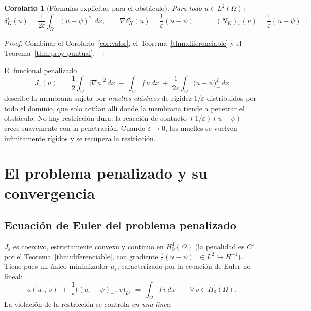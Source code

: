 \documentclass[11pt,a4paper]{article}
\newtheorem{corolario}[teorema]{Corolario}
\theoremstyle{definition}
\theoremstyle{remark}
\newcommand{\dke}{\delta_K^\varepsilon}
\begin{document}
\begin{corolario}[Fórmulas explícitas para el obstáculo]\label{cor:explicito}
Para todo $u \in L^2(\Omega)$:
\[
\dke(u) = \frac{1}{2\varepsilon}\int_\Omega (u - \psi)_-^2\,dx,
\qquad
\nabla\dke(u) = \frac{1}{\varepsilon}(u - \psi)_-,
\qquad
(N_K)_\varepsilon(u) = \frac{1}{\varepsilon}(u - \psi)_- .
\]
\end{corolario}

\begin{proof}
Combinar el Corolario~\ref{cor:valor}, el Teorema~\ref{thm:diferenciable}
y el Teorema~\ref{thm:proy-puntual}.
\end{proof}

\begin{observación}
El funcional penalizado
\[
J_\varepsilon(u)
\;=\; \frac12 \int_\Omega |\nabla u|^2\,dx
\;-\; \int_\Omega f\,u\,dx
\;+\; \frac{1}{2\varepsilon}\int_\Omega \bigl(u - \psi\bigr)_-^2\,dx
\]
describe la membrana sujeta por \emph{muelles elásticos} de rigidez
$1/\varepsilon$ distribuidos por todo el dominio, que solo actúan allí
donde la membrana tiende a penetrar el obstáculo. No hay restricción dura:
la reacción de contacto $(1/\varepsilon)(u-\psi)_-$ crece suavemente con la
penetración. Cuando $\varepsilon \to 0$, los muelles se vuelven
infinitamente rígidos y se recupera la restricción.
\end{observación}

\section{El problema penalizado y su convergencia}

\subsection{Ecuación de Euler del problema penalizado}

$J_\varepsilon$ es coercivo, estrictamente convexo y continuo en
$H^1_0(\Omega)$ (la penalidad es $C^1$ por el Teorema~\ref{thm:diferenciable},
con gradiente $\frac{1}{\varepsilon}(u - \psi)_- \in L^2 \hookrightarrow
H^{-1}$). Tiene pues un único minimizador $u_\varepsilon$,
caracterizado por la ecuación de Euler no lineal:
\begin{equation}\label{eq:euler-penalizado}
a(u_\varepsilon,\, v) \;+\; \frac{1}{\varepsilon}\bigl( (u_\varepsilon - \psi)_- ,\, v \bigr)_{L^2}
\;=\; \int_\Omega f\,v\,dx
\qquad \forall\, v \in H^1_0(\Omega).
\end{equation}
La violación de la restricción se controla \emph{en una línea}:
\end{document}
